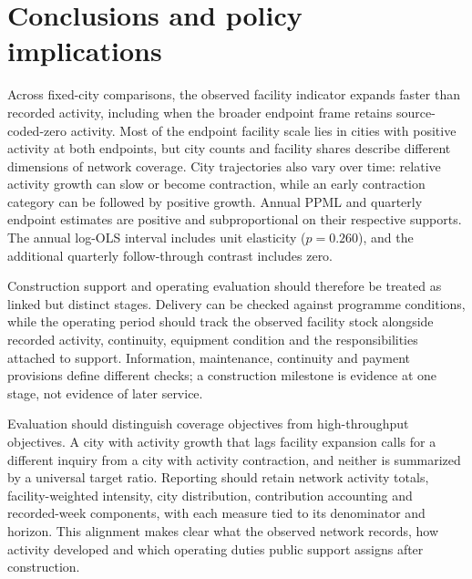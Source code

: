 \section{Conclusions and policy implications}
Across fixed-city comparisons, the observed facility indicator expands faster than recorded activity, including when the broader endpoint frame retains source-coded-zero activity. Most of the endpoint facility scale lies in cities with positive activity at both endpoints, but city counts and facility shares describe different dimensions of network coverage. City trajectories also vary over time: relative activity growth can slow or become contraction, while an early contraction category can be followed by positive growth. Annual PPML and quarterly endpoint estimates are positive and subproportional on their respective supports. The annual log-OLS interval includes unit elasticity ($p=0.260$), and the additional quarterly follow-through contrast includes zero.

Construction support and operating evaluation should therefore be treated as linked but distinct stages. Delivery can be checked against programme conditions, while the operating period should track the observed facility stock alongside recorded activity, continuity, equipment condition and the responsibilities attached to support. Information, maintenance, continuity and payment provisions define different checks; a construction milestone is evidence at one stage, not evidence of later service.

Evaluation should distinguish coverage objectives from high-throughput objectives. A city with activity growth that lags facility expansion calls for a different inquiry from a city with activity contraction, and neither is summarized by a universal target ratio. Reporting should retain network activity totals, facility-weighted intensity, city distribution, contribution accounting and recorded-week components, with each measure tied to its denominator and horizon. This alignment makes clear what the observed network records, how activity developed and which operating duties public support assigns after construction.
